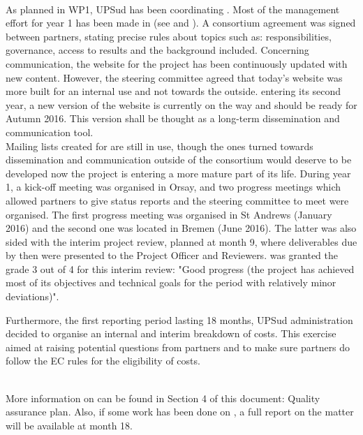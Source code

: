 \documentclass{deliverablereport}
\begin{document}
~\\As planned in WP1, UPSud has been coordinating \ODK. 
Most of the management effort for year 1 has been made in  (see  and ). 
A consortium agreement was signed between partners, stating precise rules about topics such as: responsibilities,
 governance, access to results and the background included. Concerning communication, the website for the project has been 
continuously updated with new content. However, the
steering committee agreed that today's website was more built for an internal use and not towards the outside. 
\ODK entering its second year, a new version of the website
 is currently on the way and should be ready for Autumn 2016. This version shall be thought as a long-term dissemination and communication tool.
\\Mailing lists created for \ODK are still in use, though the ones turned towards dissemination and communication outside of the 
consortium would deserve to be developed now
the project is entering a more mature part of its life. 
During year 1, a kick-off meeting was organised in Orsay, and two progress meetings which allowed partners to give status reports 
and the steering committee to meet were organised.
 The first progress meeting was organised in St Andrews (January 2016) and the second one was located in Bremen (June 2016).
The latter was also sided with the interim project review, planned at month 9, where deliverables due by then were presented to 
the Project Officer and Reviewers.
\ODK was granted the grade 3 out of 4 for this interim review: "Good progress (the project has achieved most of its objectives and technical goals for the 
period with relatively minor deviations)".

Furthermore, the first reporting period lasting 18 months, UPSud administration decided to organise an internal and interim 
breakdown of costs. This exercise aimed at raising potential questions from partners and to make sure partners do follow
the EC rules for the eligibility of costs.

~\\More information on  can be found in Section 4 of this document:
 Quality assurance plan.
Also, if some work has been done on , a full report on the matter will
 be available at month 18.
\end{document}
